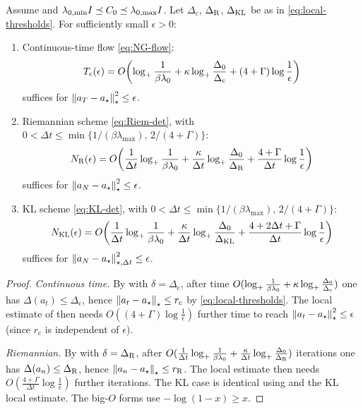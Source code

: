 \begin{theorem}
\label{thm:det-three-stage}
Assume  and
$\lambda_{0,\min}I\preceq C_0\preceq\lambda_{0,\max}I$. Let $\Delta_{\mathrm c}$,
$\Delta_{\mathrm{R}}$, $\Delta_{\mathrm{KL}}$ be as in \eqref{eq:local-thresholds}. For sufficiently
small $\epsilon>0$:
\begin{enumerate}
\item Continuous-time flow \eqref{eq:NG-flow}:
\[
    T_{\mathrm c}(\epsilon)
    =
    O\!\left(
        \log_+\frac1{\beta\lambda_0}
        +
        \kappa\log_+\frac{\Delta_0}{\Delta_{\mathrm c}}
        +
        (4+\Gamma)\log\frac1\epsilon
    \right)
\]
suffices for $\left\lVert a_T-a_\star\right\rVert_\star^2\leq\epsilon$.
\item Riemannian scheme \eqref{eq:Riem-det}, with
$0<\Delta t\leq\min\{1/(\beta\lambda_{\max}),\,2/(4+\Gamma)\}$:
\[
    N_{\mathrm{R}}(\epsilon)
    =
    O\!\left(
        \frac1{\Delta t}\log_+\frac1{\beta\lambda_0}
        +
        \frac\kappa{\Delta t}\log_+\frac{\Delta_0}{\Delta_{\mathrm{R}}}
        +
        \frac{4+\Gamma}{\Delta t}\log\frac1\epsilon
    \right)
\]
suffices for $\left\lVert a_N-a_\star\right\rVert_\star^2\leq\epsilon$.
\item KL scheme \eqref{eq:KL-det}, with
$0<\Delta t\leq\min\{1/(\beta\lambda_{\max}),\,2/(4+\Gamma)\}$:
\[
    N_{\mathrm{KL}}(\epsilon)
    =
    O\!\left(
        \frac1{\Delta t}\log_+\frac1{\beta\lambda_0}
        +
        \frac\kappa{\Delta t}\log_+\frac{\Delta_0}{\Delta_{\mathrm{KL}}}
        +
        \frac{4+2\Delta t+\Gamma}{\Delta t}\log\frac1\epsilon
    \right)
\]
suffices for $\left\lVert a_N-a_\star\right\rVert_{\star,\Delta t}^2\leq\epsilon$.
\end{enumerate}
\end{theorem}

\begin{proof}
\emph{Continuous time.} By  with $\delta=\Delta_{\mathrm c}$, after time
$O(\log_+\tfrac1{\beta\lambda_0}+\kappa\log_+\tfrac{\Delta_0}{\Delta_{\mathrm c}})$ one has
$\Delta(a_t)\leq\Delta_{\mathrm c}$, hence $\left\lVert a_t-a_\star\right\rVert_\star\leq r_{\mathrm c}$ by
\eqref{eq:local-thresholds}. The local estimate of  then needs
$O((4+\Gamma)\log\tfrac1\epsilon)$ further time to reach
$\left\lVert a_t-a_\star\right\rVert_\star^2\leq\epsilon$ (since $r_{\mathrm c}$ is independent of $\epsilon$).

\emph{Riemannian.} By  with $\delta=\Delta_{\mathrm{R}}$, after
$O(\tfrac1{\Delta t}\log_+\tfrac1{\beta\lambda_0}+\tfrac\kappa{\Delta t}\log_+\tfrac{\Delta_0}{\Delta_{\mathrm{R}}})$
iterations one has $\Delta(a_n)\leq\Delta_{\mathrm{R}}$, hence
$\left\lVert a_n-a_\star\right\rVert_\star\leq r_{\mathrm{R}}$. The local estimate then needs
$O(\tfrac{4+\Gamma}{\Delta t}\log\tfrac1\epsilon)$ further iterations. The KL case is identical
using  and the KL local estimate. The big-$O$ forms use
$-\log(1-x)\geq x$.
\end{proof}

